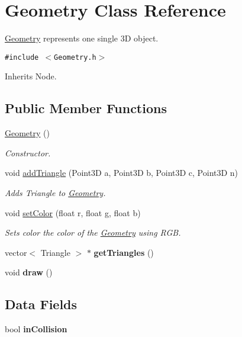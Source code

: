 \hypertarget{class_geometry}{
\section{Geometry Class Reference}
\label{class_geometry}
}
\hyperlink{class_geometry}{Geometry} represents one single 3D object.  


{\tt \#include $<$Geometry.h$>$}

Inherits Node.

\subsection*{Public Member Functions}
\begin{CompactItemize}
\item 
\hyperlink{class_geometry_ddb32f0091124e3b461bec6677b2e17b}{Geometry} ()
\begin{CompactList}\small\item\em Constructor. \item\end{CompactList}\item 
void \hyperlink{class_geometry_b4ead4f0144f2780838c99ea231ae312}{addTriangle} (Point3D a, Point3D b, Point3D c, Point3D n)
\begin{CompactList}\small\item\em Adds Triangle to \hyperlink{class_geometry}{Geometry}. \item\end{CompactList}\item 
void \hyperlink{class_geometry_ecfe13058d31edaa7fa94efc6b5503f7}{setColor} (float r, float g, float b)
\begin{CompactList}\small\item\em Sets color the color of the \hyperlink{class_geometry}{Geometry} using RGB. \item\end{CompactList}\item 
\hypertarget{class_geometry_893279378714c57cbc1f26efdeda6c8c}{
vector$<$ Triangle $>$ $\ast$ \textbf{getTriangles} ()}
\label{class_geometry_893279378714c57cbc1f26efdeda6c8c}

\item 
\hypertarget{class_geometry_56c5cf8a568cff737ff95520cbe6b405}{
void \textbf{draw} ()}
\label{class_geometry_56c5cf8a568cff737ff95520cbe6b405}

\end{CompactItemize}
\subsection*{Data Fields}
\begin{CompactItemize}
\item 
\hypertarget{class_geometry_b42d47b788b9f4df2ec094a2f75dc297}{
bool \textbf{inCollision}}
\label{class_geometry_b42d47b788b9f4df2ec094a2f75dc297}

\end{CompactItemize}
